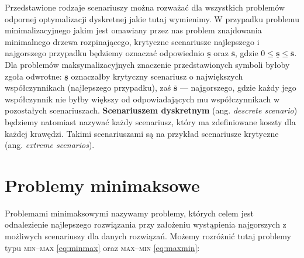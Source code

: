 Przedstawione rodzaje scenariuszy można rozważać dla wszystkich problemów odpornej optymalizacji dyskretnej jakie tutaj wymienimy. W przypadku problemu minimalizacyjnego jakim jest omawiany przez nas problem znajdowania minimalnego drzewa rozpinającego, krytyczne scenariusze najlepszego i najgorszego przypadku będziemy oznaczać odpowiednio $\underline{\textbf{s}}$ oraz $\overline{\textbf{s}}$, gdzie $0 \leqslant \underline{\textbf{s}} \leqslant \overline{\textbf{s}}$. Dla problemów maksymalizacyjnych znaczenie przedstawionych symboli byłoby zgoła odwrotne: $\underline{\textbf{s}}$ oznaczałby krytyczny scenariusz o największych współczynnikach (najlepszego przypadku), zaś $\overline{\textbf{s}}$ --- najgorszego, gdzie każdy jego współczynnik nie byłby większy od odpowiadających mu współczynnikach w pozostałych scenariuszach. \textbf{Scenariuszem dyskretnym} (ang. \textit{descrete scenario}) będziemy natomiast nazywać każdy scenariusz, który ma zdefiniowane koszty dla każdej krawędzi. Takimi scenariuszami są na przykład scenariusze krytyczne (ang. \textit{extreme scenarios}).

\section{Problemy minimaksowe}

Problemami minimaksowymi nazywamy problemy, których celem jest odnalezienie najlepszego rozwiązania przy założeniu wystąpienia najgorszych z możliwych scenariuszy dla danych rozwiązań. Możemy rozróżnić tutaj problemy typu \textsc{min--max} \ref{eq:minmax} oraz \textsc{max--min} \ref{eq:maxmin}:

